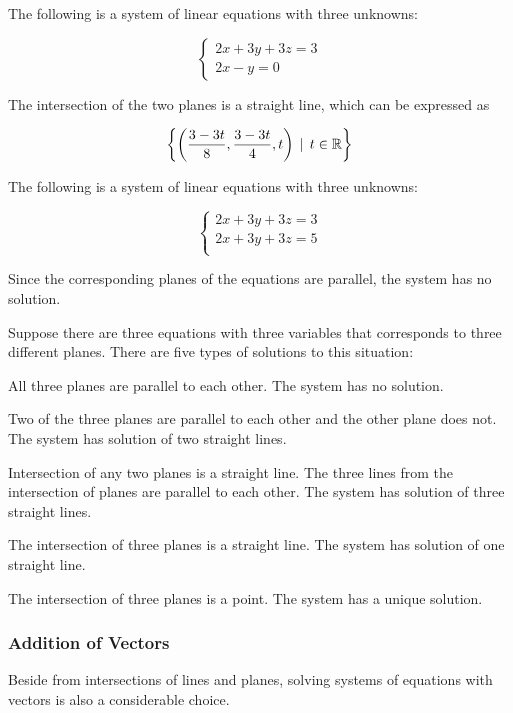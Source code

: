 \documentclass[a4paper,12pt]{article}
\begin{document}
\begin{exm}
  The following is a system of linear equations with three unknowns:

  $$\begin{cases}
    2x+3y+3z=3\\
    2x-y=0
  \end{cases}$$\s

  The intersection of the two planes is a straight line, which can be expressed as

  $$\left\{ \left( \frac{3-3t}{8},\frac{3-3t}{4},t\right)\,\mid\, t\in\mathbb{R}\right\}$$
\end{exm}\n

\begin{exm}
  The following is a system of linear equations with three unknowns:

  $$\begin{cases}
    2x+3y+3z=3\\
    2x+3y+3z=5\\
  \end{cases}$$\s

  Since the corresponding planes of the equations are parallel, the system has no solution.
\end{exm}\n

Suppose there are three equations with three variables that corresponds to three different planes. There are five types of solutions to this situation:

\begin{alist}
  \item All three planes are parallel to each other. The system has no solution.
  \item Two of the three planes are parallel to each other and the other plane does not. The system has solution of two straight lines.
  \item Intersection of any two planes is a straight line. The three lines from the intersection of planes are parallel to each other. The system has solution of three straight lines.
  \item The intersection of three planes is a straight line. The system has solution of one straight line.
  \item The intersection of three planes is a point. The system has a unique solution.
\end{alist}

\subsubsection{Addition of Vectors}
Beside from intersections of lines and planes, solving systems of equations with vectors is also a considerable choice.\n
\end{document}
